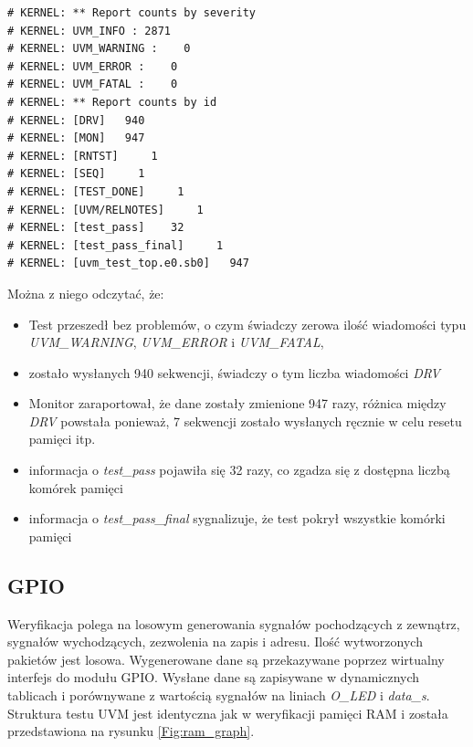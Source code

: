 \documentclass[11pt,a4paper]{article}
\begin{document}
 \begin{minipage}{\textwidth}
\begin{scriptsize}
\begin{lstlisting}[label=Lis:uvm_ram_report,caption=UVM raport]
# KERNEL: ** Report counts by severity
# KERNEL: UVM_INFO : 2871
# KERNEL: UVM_WARNING :    0
# KERNEL: UVM_ERROR :    0
# KERNEL: UVM_FATAL :    0
# KERNEL: ** Report counts by id
# KERNEL: [DRV]   940
# KERNEL: [MON]   947
# KERNEL: [RNTST]     1
# KERNEL: [SEQ]     1
# KERNEL: [TEST_DONE]     1
# KERNEL: [UVM/RELNOTES]     1
# KERNEL: [test_pass]    32
# KERNEL: [test_pass_final]     1
# KERNEL: [uvm_test_top.e0.sb0]   947
\end{lstlisting}
\end{scriptsize}
\end{minipage}
Można z niego odczytać, że:
\begin{itemize}
	\item Test przeszedł bez problemów, o czym świadczy zerowa ilość wiadomości typu \textit{UVM\_WARNING}, \textit{UVM\_ERROR} i \textit{UVM\_FATAL},
	\item zostało wysłanych 940 sekwencji, świadczy o tym liczba wiadomości \textit{DRV}
	\item Monitor zaraportował, że dane zostały zmienione 947 razy, różnica między \textit{DRV} powstała ponieważ, 7 sekwencji zostało wysłanych ręcznie w celu resetu pamięci itp.
	\item informacja o \textit{test\_pass} pojawiła się 32 razy, co zgadza się z dostępna liczbą komórek pamięci
	\item informacja o \textit{test\_pass\_final} sygnalizuje, że test pokrył wszystkie komórki pamięci
\end{itemize}
\subsection{GPIO}
\hspace{5mm} Weryfikacja polega na losowym generowania sygnałów pochodzących z zewnątrz, sygnałów wychodzących, zezwolenia na zapis i adresu. Ilość wytworzonych pakietów jest losowa. Wygenerowane dane są przekazywane poprzez wirtualny interfejs do modułu GPIO. Wysłane dane są zapisywane w dynamicznych tablicach i porównywane z wartością sygnałów na liniach \textit{O\_LED} i \textit{data\_s}. Struktura testu UVM jest identyczna jak w weryfikacji pamięci RAM i została przedstawiona na rysunku \ref{Fig:ram_graph}.
\end{document}
